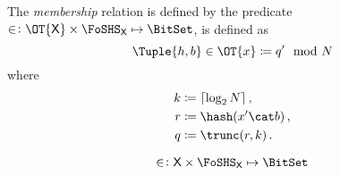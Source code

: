 \documentclass[ ../main.tex]{subfiles}
\begin{document}
%


The \emph{membership} relation is defined by the predicate $\SetContains \colon \OT{\Set{X}} \times \FoSHS_{\Set{X}} \mapsto \BitSet$, is defined as
\begin{equation}
    \Tuple{h,b} \SetContains \OT{x} \coloneqq q' \mod N
\end{equation}
where
\begin{equation}
    \begin{split}
        k &\coloneqq \lceil \log_2 N \rceil\,,\\
        r &\coloneqq \hash(x' \cat b)\,,\\
        q &\coloneqq \trunc(r,k)\,.
    \end{split}
\end{equation}



\begin{definition}
    \begin{equation}
        \SetContains \colon \Set{X} \times \FoSHS_{\Set{X}} \mapsto \BitSet
    \end{equation}
    
\end{definition}
\end{document}
